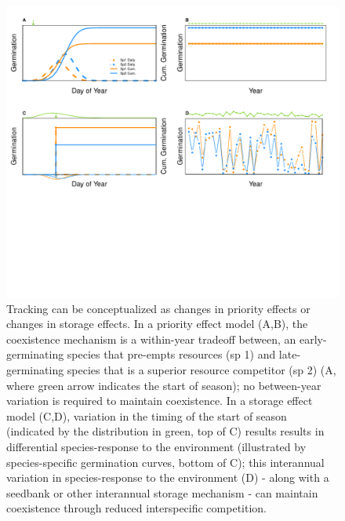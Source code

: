 \documentclass[11pt,letterpaper]{article}
\begin{document}
\begin{figure}[h!]
\centering
\includegraphics[width=1\textwidth]{..//..//..//R/graphs/conceptual/PriorityEff_BetHedge.pdf}
\caption{Tracking can be conceptualized as changes in priority effects or changes in storage effects.  In a priority effect model (A,B), the coexistence mechanism is a within-year tradeoff between, an early-germinating species that pre-empts resources (sp 1) and late-germinating species that is a superior resource competitor (sp 2) (A, where green arrow indicates the start of season); no between-year variation is required to maintain coexistence. In a storage effect model (C,D), variation in the timing of the start of season (indicated by the distribution in green, top of C) results results in differential species-response to the environment (illustrated by species-specific germination curves, bottom of C); this interannual variation in species-response to the environment (D) - along with a seedbank or other interannual storage mechanism - can maintain coexistence through reduced interspecific competition.}
\label{fig:conceptmodels} 
\end{figure}


\clearpage
\newpage


\end{document}
